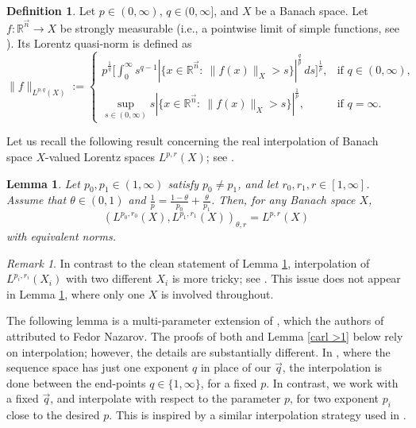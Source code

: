 \documentclass[11pt, reqno]{amsart}
\newtheorem{lemma}[theorem]{Lemma}
\theoremstyle{definition}
\newtheorem{definition}[theorem]{Definition}
\theoremstyle{remark}
\newtheorem{remark}[theorem]{Remark}
\numberwithin{equation}{section}
\newcommand{\vn}{\vec n}
\newcommand{\vq}{\vec q}
\begin{document}
\begin{definition}
Let $p\in(0,\infty)$, $q\in(0,\infty]$, and $X$ be a Banach space.
Let $f:\mathbb R^{\vn}\to X$ be strongly measurable (i.e., a pointwise limit of simple functions, see \cite[Chapter 1]{HNVW1}).
Its Lorentz quasi-norm is defined as
$$
\|f\|_{L^{p,q}(X)}
:=\begin{cases}
\displaystyle
p^{\frac1q}\bigg[\int_0^\infty s^{q-1}
|\{x\in \mathbb R^{\vn}:\ \|f(x)\|_X>s\}|^{\frac qp} \, ds\bigg]^{\frac1p},
&\text{if } q\in(0,\infty),\\
\displaystyle
\sup_{s\in(0,\infty)} s |\{x\in \mathbb R^{\vn}:\ \|f(x)\|_X >s\}|^{\frac 1p},
&\text{if } q=\infty.
\end{cases}
$$
\end{definition}

Let us recall the following result concerning the real interpolation
of Banach space $X$-valued Lorentz spaces $L^{p,r}(X)$;
see \cite[Section 1.18.6, Theorem 2]{Tri78}.

\begin{lemma}\label{interp}
Let $p_0,p_1\in(1,\infty)$ satisfy $p_0\neq p_1$,
and let $r_0,r_1,r\in[1,\infty]$.
Assume that $\theta\in(0,1)$ and $\frac 1p=\frac{1-\theta}{p_0}+\frac{\theta}{p_1}$.
Then, for any Banach space $X$,
\begin{equation*}
(L^{p_0,r_0}(X),L^{p_1,r_1}(X))_{\theta,r}=L^{p,r}(X)
\end{equation*}
with equivalent norms.
\end{lemma}

\begin{remark}\label{Cwikel}
In contrast to the clean statement of Lemma \ref{interp},
interpolation of $L^{p_i,r_i}(X_i)$ with two different $X_i$
is more tricky; see \cite{Cwi74}. This issue does not appear in
Lemma \ref{interp}, where only one $X$ is involved throughout.
\end{remark}

The following lemma is a multi-parameter extension of \cite[Theorem 3.7(ii)]{FR21}, which the authors of \cite{FR21}
attributed to Fedor Nazarov. The proofs of both \cite[Theorem 3.7(ii)]{FR21} and Lemma \ref{carl >1} below rely on interpolation; however, the details are substantially different. In \cite[Theorem 3.7(ii)]{FR21}, where the sequence space has just one exponent $q$ in place of our $\vq$, the interpolation is done between the end-points $q\in\{1,\infty\}$, for a fixed $p$. In contrast, we work with a fixed $\vq$, and interpolate with respect to the parameter $p$, for two exponent $p_i$ close to the desired $p$. This is inspired by a similar interpolation strategy used in \cite[Section 8]{HMP}.
\end{document}
